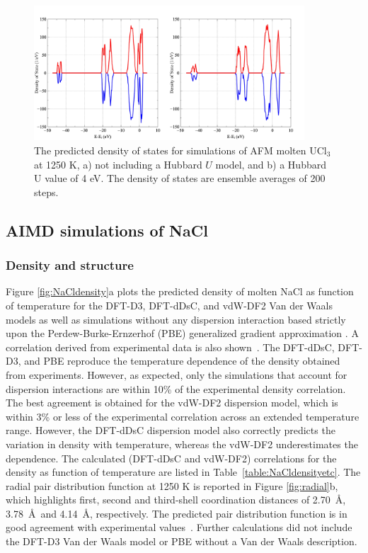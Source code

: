 \documentclass[preprint,3p,10pt,onecolumn,number,sort&compress]{elsarticle}
\begin{document}
\begin{figure}[h]
\centering
\includegraphics[width=0.9\textwidth]{fig3.jpg}
\caption{The predicted density of states for simulations of AFM molten UCl$_3$ at 1250 K, a) not including a Hubbard $U$ model, and b) a Hubbard U value of 4 eV. {\color{red}The density of states are ensemble averages of 200 steps.}}
\label{fig:DOS}
\end{figure}


\subsection{AIMD simulations of NaCl}
\subsubsection{Density and structure}
Figure \ref{fig:NaCldensity}a plots the predicted density of molten NaCl as function of temperature for the DFT-D3, DFT-dDsC, and vdW-DF2 Van der Waals models as well as simulations without any dispersion interaction based strictly upon the Perdew-Burke-Ernzerhof (PBE) generalized gradient approximation \cite{pbe}. A correlation derived from experimental data is also shown~\cite{Janz1988}. The DFT-dDsC, DFT-D3, and PBE reproduce the temperature dependence of the density obtained from experiments. However, as expected, only the simulations that account for dispersion interactions are within 10\% of the experimental density correlation. The best agreement is obtained for the vdW-DF2 dispersion model, which is within 3\% or less of the experimental correlation across an extended temperature range. However, the DFT-dDsC dispersion model also correctly predicts the variation in density with temperature, whereas the vdW-DF2 underestimates the dependence. The calculated (DFT-dDsC and vdW-DF2) correlations for the density as function of temperature are listed in Table~\ref{table:NaCldensityetc}. The radial pair distribution function at 1250 K is reported in Figure \ref{fig:radial}b, which highlights first, second and third-shell coordination distances of 2.70~\AA, 3.78~\AA~and 4.14~\AA, respectively. The predicted pair distribution function is in good agreement with experimental values~\cite{Edwards_1975}. Further calculations did not include the DFT-D3 Van der Waals model or PBE without a Van der Waals description. 
\end{document}
